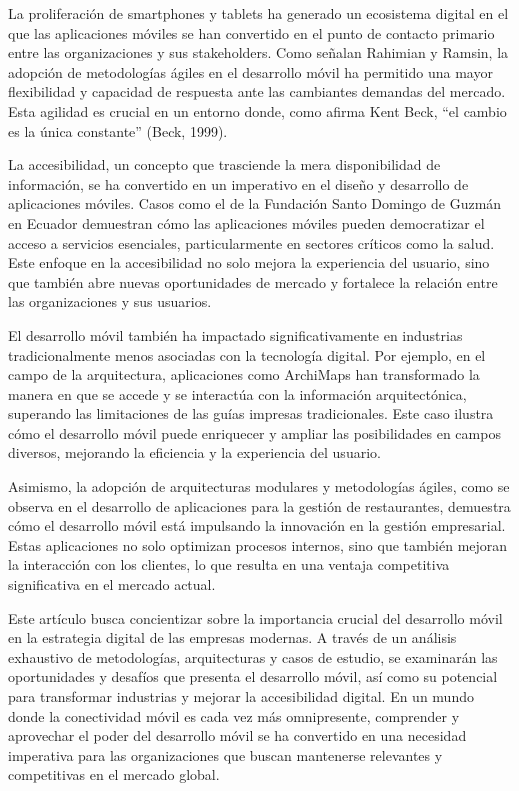 \documentclass[12pt]{article}
\begin{document}
La proliferación de smartphones y tablets ha generado un ecosistema digital en el que las aplicaciones móviles se han convertido en el punto de contacto primario entre las organizaciones y sus stakeholders. Como señalan Rahimian y Ramsin, la adopción de metodologías ágiles en el desarrollo móvil ha permitido una mayor flexibilidad y capacidad de respuesta ante las cambiantes demandas del mercado. Esta agilidad es crucial en un entorno donde, como afirma Kent Beck, \enquote{el cambio es la única constante} (Beck, 1999).

La accesibilidad, un concepto que trasciende la mera disponibilidad de información, se ha convertido en un imperativo en el diseño y desarrollo de aplicaciones móviles. Casos como el de la Fundación Santo Domingo de Guzmán en Ecuador demuestran cómo las aplicaciones móviles pueden democratizar el acceso a servicios esenciales, particularmente en sectores críticos como la salud. Este enfoque en la accesibilidad no solo mejora la experiencia del usuario, sino que también abre nuevas oportunidades de mercado y fortalece la relación entre las organizaciones y sus usuarios.

El desarrollo móvil también ha impactado significativamente en industrias tradicionalmente menos asociadas con la tecnología digital. Por ejemplo, en el campo de la arquitectura, aplicaciones como ArchiMaps han transformado la manera en que se accede y se interactúa con la información arquitectónica, superando las limitaciones de las guías impresas tradicionales. Este caso ilustra cómo el desarrollo móvil puede enriquecer y ampliar las posibilidades en campos diversos, mejorando la eficiencia y la experiencia del usuario.

Asimismo, la adopción de arquitecturas modulares y metodologías ágiles, como se observa en el desarrollo de aplicaciones para la gestión de restaurantes, demuestra cómo el desarrollo móvil está impulsando la innovación en la gestión empresarial. Estas aplicaciones no solo optimizan procesos internos, sino que también mejoran la interacción con los clientes, lo que resulta en una ventaja competitiva significativa en el mercado actual.

Este artículo busca concientizar sobre la importancia crucial del desarrollo móvil en la estrategia digital de las empresas modernas. A través de un análisis exhaustivo de metodologías, arquitecturas y casos de estudio, se examinarán las oportunidades y desafíos que presenta el desarrollo móvil, así como su potencial para transformar industrias y mejorar la accesibilidad digital. En un mundo donde la conectividad móvil es cada vez más omnipresente, comprender y aprovechar el poder del desarrollo móvil se ha convertido en una necesidad imperativa para las organizaciones que buscan mantenerse relevantes y competitivas en el mercado global.
\end{document}
